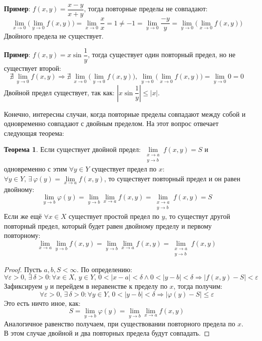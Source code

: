 \documentclass[12pt]{article}
\newcommand{\VE}{\varepsilon}
\theoremstyle{definition}
\newtheorem{theorem}{Теорема}
\begin{document}
\textbf{Пример}: $f(x,y) = \dfrac{x -y}{x+y}$, тогда повторные пределы не совпадают:
$$
	\lim\limits_{x \to 0}\Big(\lim\limits_{y\to 0} f(x,y)\Big) = \lim\limits_{x \to 0}\dfrac{x}{x} = 1 \neq -1 = \lim\limits_{y \to 0} \dfrac{-y}{y} = \lim\limits_{y \to 0}\Big(\lim\limits_{x\to 0} f(x,y)\Big)
$$
Двойного предела не существует.

\textbf{Пример}: $f(x,y) = x \sin{\dfrac{1}{y}}$, тогда существует один повторный предел, но не существует второй:
$$
	\nexists \, \lim\limits_{y \to 0} f(x,y) \Rightarrow \nexists \, \lim\limits_{x \to 0}\Big(\lim\limits_{y\to 0} f(x,y)\Big), \, \lim\limits_{y \to 0}\Big(\lim\limits_{x\to 0} f(x,y)\Big) = \lim\limits_{y \to 0} 0 = 0
$$
Двойной предел существует, так как: $\left|x \sin{\dfrac{1}{y}}\right| \leq |x|$.

Конечно, интересны случаи, когда повторные пределы совпадают между собой и одновременно совпадают с двойным пределом. На этот вопрос отвечает следующая теорема:
\begin{theorem}
	Если существует двойной предел: $\lim\limits_{\substack{x \to a \\ y \to b}}f(x,y) = S$ и одновременно с этим $\forall y  \in Y$ существует предел по $x$: $
	\forall y \in Y, \, \exists \, \varphi(y) = \lim\limits_{x \to a} f(x,y)$, то существует повторный предел и он равен двойному:
	$$
		\lim\limits_{y \to b} \varphi(y) = \lim\limits_{y \to b}\lim\limits_{x \to a}f(x,y) = \lim\limits_{\substack{x \to a \\ y \to b}}f(x,y) = S
	$$
	Если же ещё $\forall x \in X$ существует простой предел по $y$, то существут другой повторный предел, который будет равен двойному пределу и первому повторному:
	$$
		\lim\limits_{x \to a}\lim\limits_{y \to b}f(x,y) = \lim\limits_{y \to b}\lim\limits_{x \to a}f(x,y) = \lim\limits_{\substack{x \to a \\ y \to b}}f(x,y)
	$$
\end{theorem}
\begin{proof}
	Пусть $a,b, S < \infty$. По определению:
	$$
		\forall \VE > 0,\, \exists \, \delta > 0 \colon \forall x \in X, \, y \in Y, \, 0 < |x - a| < \delta \wedge 0 < |y - b| < \delta \Rightarrow |f(x,y) - S| < \VE
	$$
	Зафиксируем $y$ и перейдем в неравенстве к пределу по $x$, тогда получим:
	$$
		\forall \VE > 0,\, \exists \, \delta > 0 \colon\forall y \in Y, \, 0 < |y - b| < \delta \Rightarrow|\varphi(y) - S| \leq \VE
	$$
	Это есть ничто иное, как:
	$$
		S = \lim\limits_{y \to b}\varphi(y) = \lim\limits_{y \to b}\lim\limits_{x \to a}f(x,y)
	$$
	Аналогичное равенство получаем, при существовании повторного предела по $x$. В этом случае двойной и два повторных предела будут совпадать.
\end{proof}
\end{document}
